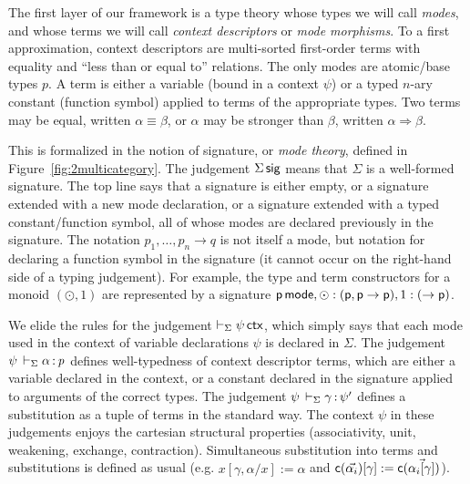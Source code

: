 \documentclass[a4paper,USenglish,numberwithinsect]{lipics-v2016}
\newcommand\deq{\ensuremath{\equiv}}
\newcommand\spr{\ensuremath{\Rightarrow}} %
\begin{document}
The first layer of our framework is a type theory whose types we will
call \emph{modes}, and whose terms we will call \emph{context
  descriptors} or \emph{mode morphisms}.  To a first approximation,
context descriptors are multi-sorted first-order terms with equality and
``less than or equal to'' relations.  The only modes are atomic/base
types $p$.  A term is either a variable (bound in a context $\psi$) or a
typed $n$-ary constant (function symbol)  applied to terms of the
appropriate types.  Two terms may be equal, written $\alpha \deq \beta$,
or $\alpha$ may be stronger than $\beta$, written $\alpha \spr \beta$.  

This is formalized in the notion of signature, or \emph{mode theory},
defined in Figure~\ref{fig:2multicategory}.  The judgement $\Sigma \, \mathsf{sig}$ means that $\Sigma$ is a well-formed signature.  The top line
says that a signature is either empty, or a signature extended with a
new mode declaration, or a signature extended with a typed
constant/function symbol, all of whose modes are declared previously in
the signature.  The notation $p_1,\ldots,p_n \to q$ is not itself a
mode, but notation for declaring a function symbol in the signature (it
cannot occur on the right-hand side of a typing judgement).  For
example, the type and term constructors for a monoid $(\odot,1)$ are
represented by a signature $\mathsf{p} \, \mathsf{mode}, \mathsf{\odot} :
(\mathsf{p},\mathsf{p} \to \mathsf{p}), 1 : (\to \mathsf{p})$.

We elide the rules for the judgement $\vdash_\Sigma \psi \, \mathsf{ctx}$, which
simply says that each mode used in the context of variable declarations
$\psi$ is declared in $\Sigma$.  The judgement
$\psi \,\vdash_{\Sigma} \mathit{\alpha} \, \mathit{:} \, \mathit{p}$ defines well-typedness of context
descriptor terms, which are either a variable declared in the context,
or a constant declared in the signature applied to arguments of the
correct types.  The judgement $\psi \,\vdash_{\Sigma} \mathit{\gamma} \, \mathit{:} \, \mathit{\psi'}$
defines a substitution as a tuple of terms in the standard way.  The
context $\psi$ in these judgements enjoys the cartesian structural
properties (associativity, unit, weakening, exchange, contraction).
Simultaneous substitution into terms and substitutions is defined as
usual (e.g.  $x[\gamma,\alpha/x] := \alpha$ and
$\mathsf{c}(\vec{\alpha_i})[\gamma] := \mathsf{c}(\vec{\alpha_i[\gamma]})$).
\end{document}
